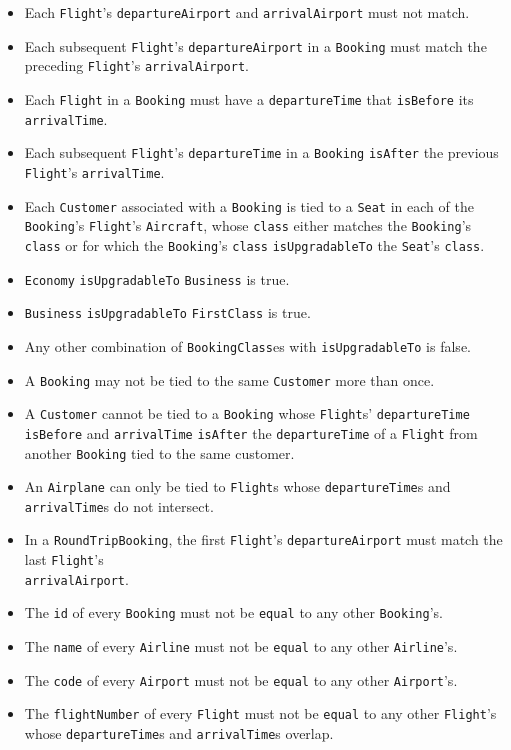 \documentclass[12pt,a4paper,titlepage]{article}
\def\code#1{\texttt{#1}}
\begin{document}
\begin{itemize}
\item Each \code{Flight}'s \code{departureAirport} and \code{arrivalAirport} must not match.
\item Each subsequent \code{Flight}'s \code{departureAirport} in a \code{Booking} must match the preceding \code{Flight}'s \code{arrivalAirport}.
\item Each \code{Flight} in a \code{Booking} must have a \code{departureTime} that \code{isBefore} its \code{arrivalTime}.
\item Each subsequent \code{Flight}'s \code{departureTime} in a \code{Booking} \code{isAfter} the previous \code{Flight}'s \code{arrivalTime}.
\item Each \code{Customer} associated with a \code{Booking} is tied to a \code{Seat} in each of the \code{Booking}'s \code{Flight}'s \code{Aircraft}, whose \code{class} either matches the \code{Booking}'s \code{class} or for which the \code{Booking}'s \code{class} \code{isUpgradableTo} the \code{Seat}'s \code{class}.
\item \code{Economy} \code{isUpgradableTo} \code{Business} is true.
\item \code{Business} \code{isUpgradableTo} \code{FirstClass} is true.
\item Any other combination of \code{BookingClass}es with \code{isUpgradableTo} is false.
\item A \code{Booking} may not be tied to the same \code{Customer} more than once.
\item A \code{Customer} cannot be tied to a \code{Booking} whose \code{Flight}s' \code{departureTime} \code{isBefore} and \code{arrivalTime} \code{isAfter} the \code{departureTime} of a \code{Flight} from another \code{Booking} tied to the same customer.
\item An \code{Airplane} can only be tied to \code{Flight}s whose \code{departureTime}s and \code{arrivalTime}s do not intersect.
\item In a \code{RoundTripBooking}, the first \code{Flight}'s \code{departureAirport} must match the last \code{Flight}'s \\\code{arrivalAirport}.
\item The \code{id} of every \code{Booking} must not be \code{equal} to any other \code{Booking}'s.
\item The \code{name} of every \code{Airline} must not be \code{equal} to any other \code{Airline}'s.
\item The \code{code} of every \code{Airport} must not be \code{equal} to any other \code{Airport}'s.
\item The \code{flightNumber} of every \code{Flight} must not be \code{equal} to any other \code{Flight}'s whose \code{departureTime}s and \code{arrivalTime}s overlap.
\end{itemize}
\end{document}
